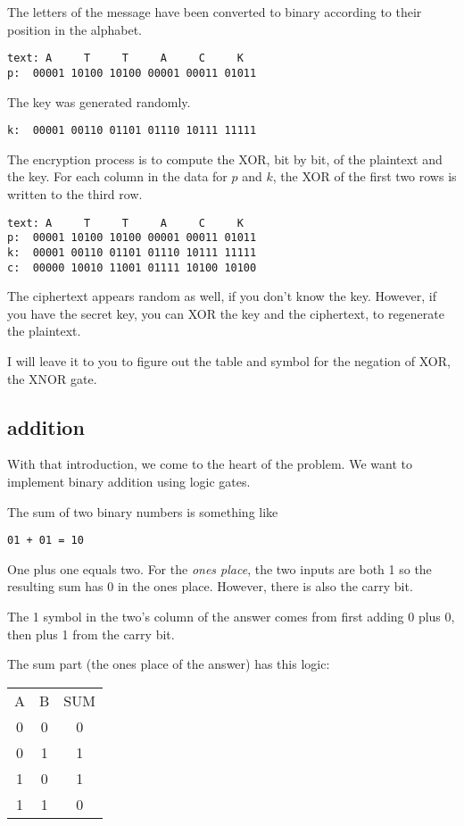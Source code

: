 \documentclass[11pt, oneside]{article}
\begin{document}
The letters of the message have been converted to binary according to their position in the alphabet.
\begin{verbatim}
text: A     T     T     A     C     K
p:  00001 10100 10100 00001 00011 01011
\end{verbatim}

The key was generated randomly.  
\begin{verbatim}
k:  00001 00110 01101 01110 10111 11111
\end{verbatim}

The encryption process is to compute the XOR, bit by bit, of the plaintext and the key.  For each column in the data for $p$ and $k$, the XOR of the first two rows is written to the third row.

\begin{verbatim}
text: A     T     T     A     C     K
p:  00001 10100 10100 00001 00011 01011
k:  00001 00110 01101 01110 10111 11111
c:  00000 10010 11001 01111 10100 10100
\end{verbatim}

The ciphertext appears random as well, if you don't know the key.  However, if you have the secret key, you can XOR the key and the ciphertext, to regenerate the plaintext.

I will leave it to you to figure out the table and symbol for the negation of XOR, the XNOR gate.

\subsection*{addition}

With that introduction, we come to the heart of the problem.  We want to implement binary addition using logic gates.  

The sum of two binary numbers is something like

\begin{verbatim}
01 + 01 = 10
\end{verbatim}

One plus one equals two.  For the \emph{ones place}, the two inputs are both 1 so the resulting sum has 0 in the ones place.  However, there is also the carry bit.

The 1 symbol in the two's column of the answer comes from first adding 0 plus 0, then plus 1 from the carry bit.

The sum part (the ones place of the answer) has this logic:

\begin{center}
\begin{tabular}{ |c|c|c| } 
\hline
A & B & SUM \\ 
 0 & 0 & 0 \\ 
 0 & 1 & 1  \\ 
 1 & 0 & 1  \\  
 1 & 1 & 0  \\  
\hline
\end{tabular}
\end{center}
\end{document}
